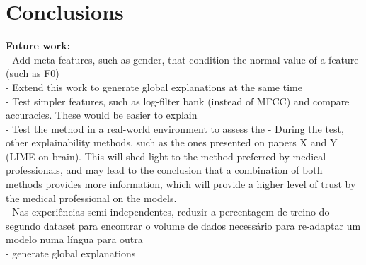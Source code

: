
\chapter{Conclusions}
\label{ch:magna}



\textbf{Future work: }\\
 - Add meta features, such as gender, that condition the normal value of a feature (such as F0) \\
 - Extend this work to generate global explanations at the same time \\
 - Test simpler features, such as log-filter bank (instead of MFCC) and compare accuracies. These would be easier to explain \\
 - Test the method in a real-world environment to assess the 
 - During the test, other explainability methods, such as the ones presented on papers X and Y (LIME on brain). This will shed light to the method preferred by medical professionals, and may lead to the conclusion that a combination of both methods provides more information, which will provide a higher level of trust by the medical professional on the models.\\
 - Nas experiências semi-independentes, reduzir a percentagem de treino do segundo dataset para encontrar o volume de dados necessário para re-adaptar um modelo numa língua para outra \\
 - generate global explanations

